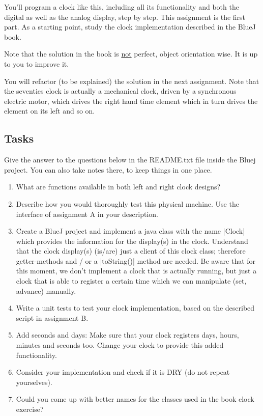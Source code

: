 \begin{multicols}{2}
You’ll program a clock like this, including all its functionality and
both the digital as well as the analog display, step by step. This
assignment is the first part. As a starting point, study the clock
implementation described in the BlueJ book. 

Note that the solution in the book is \underline{not} perfect, object orientation
wise. It is up to you to improve it.

You will refactor (to be explained) the solution in the next assignment.
Note that the seventies clock is actually a mechanical clock, driven
by a synchronous electric motor, which drives the right hand time
element which in turn drives the element on  its left and so on.

\subsection*{Tasks}
Give the answer to the questions below in the README.txt file inside the Bluej project.
You can also take notes there, to keep things in one place.

\begin{enumerate}[label=\Alph*]
\item What are functions available in both left and right clock designs?
\item Describe how you would thoroughly test this physical
  machine. Use the interface of assignment A in your description.
\item Create a BlueJ project and implement a java class with the name
  |Clock| which provides the information for the display(s) in the
  clock. Understand that the clock display(s) (is/are) just a client of this
  clock class; therefore getter-methods
  and / or a |toString()| method are needed.
  Be aware that for this moment, we don’t implement a clock that is
  actually running, but just a clock that is able to register a
  certain time which we can manipulate (set, advance) manually.
\item Write a unit tests to test your clock implementation,
  based on the described script in assignment B.
\item Add seconds and days: Make sure that your clock registers days, hours,
  minutes and seconds too. Change your clock to provide this added
  functionality.
\item Consider your implementation and check if it is DRY (do not
  repeat yourselves).
\item Could you come up with better names for the classes used in the
  book clock exercise?
\end{enumerate}
\end{multicols}


